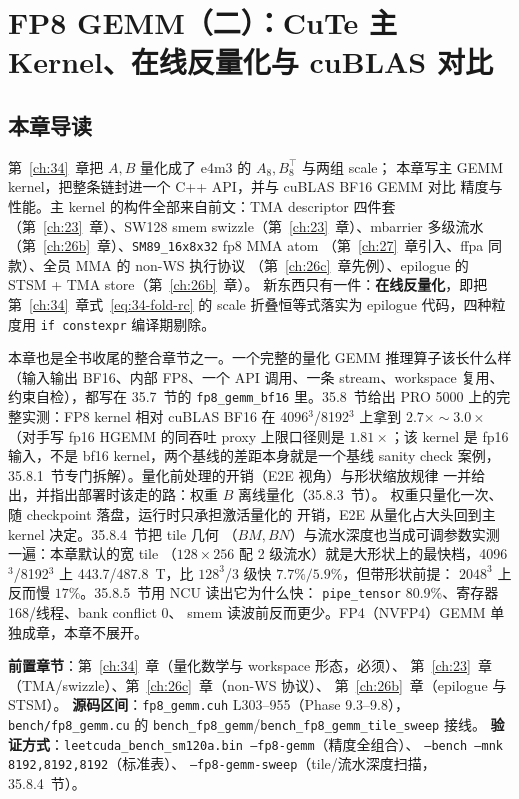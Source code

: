 \chapter{FP8 GEMM（二）：CuTe 主 Kernel、在线反量化与 cuBLAS 对比}\label{ch:35}

\section{本章导读}

第~\ref{ch:34}~章把 $A,B$ 量化成了 e4m3 的 $A_8,B_8^{\top}$ 与两组 scale；
本章写主 GEMM kernel，把整条链封进一个 C++ API，并与 cuBLAS BF16 GEMM 对比
精度与性能。主 kernel 的构件全部来自前文：TMA descriptor 四件套
（第~\ref{ch:23}~章）、SW128 smem swizzle（第~\ref{ch:23}~章）、mbarrier
多级流水（第~\ref{ch:26b}~章）、\texttt{SM89\_16x8x32} fp8 MMA atom
（第~\ref{ch:27}~章引入、ffpa 同款）、全员 MMA 的 non-WS 执行协议
（第~\ref{ch:26c}~章先例）、epilogue 的 STSM + TMA store（第~\ref{ch:26b}~章）。
新东西只有一件：\textbf{在线反量化}，即把第~\ref{ch:34}~章式~\ref{eq:34-fold-rc}
的 scale 折叠恒等式落实为 epilogue 代码，四种粒度用 \texttt{if constexpr}
编译期剔除。

本章也是全书收尾的整合章节之一。一个完整的量化 GEMM 推理算子该长什么样
（输入输出 BF16、内部 FP8、一个 API 调用、一条 stream、workspace 复用、
约束自检），都写在 35.7~节的 \texttt{fp8\_gemm\_bf16} 里。35.8~节给出 PRO 5000
上的完整实测：FP8 kernel 相对 cuBLAS BF16 在 4096$^3$/8192$^3$ 上拿到
$2.7\times\sim3.0\times$（对手写 fp16 HGEMM 的同吞吐 proxy 上限口径则是
$1.81\times$；该 kernel 是 fp16 输入，不是 bf16 kernel，两个基线的差距本身就是一个基线 sanity check 案例，
35.8.1~节专门拆解）。量化前处理的开销（E2E 视角）与形状缩放规律
一并给出，并指出部署时该走的路：权重 $B$ 离线量化（35.8.3~节）。
权重只量化一次、随 checkpoint 落盘，运行时只承担激活量化的
开销，E2E 从量化占大头回到主 kernel 决定。35.8.4~节把 tile 几何
（$BM,BN$）与流水深度也当成可调参数实测一遍：本章默认的宽 tile
（$128\times256$ 配 2 级流水）就是大形状上的最快档，4096$^3$/8192$^3$ 上
443.7/487.8~T，比 $128^3$/3 级快 $7.7\%/5.9\%$，但带形状前提：
$2048^3$ 上反而慢 $17\%$。35.8.5~节用 NCU 读出它为什么快：
\texttt{pipe\_tensor} 80.9\%、寄存器 168/线程、bank conflict 0、
smem 读波前反而更少。FP4（NVFP4）GEMM 单独成章，本章不展开。

\textbf{前置章节}：第~\ref{ch:34}~章（量化数学与 workspace 形态，必须）、
第~\ref{ch:23}~章（TMA/swizzle）、第~\ref{ch:26c}~章（non-WS 协议）、
第~\ref{ch:26b}~章（epilogue 与 STSM）。
\textbf{源码区间}：\texttt{fp8\_gemm.cuh} L303--955（Phase 9.3--9.8），
\texttt{bench/fp8\_gemm.cu} 的 \texttt{bench\_fp8\_gemm}/\texttt{bench\_fp8\_gemm\_tile\_sweep}
接线。
\textbf{验证方式}：\texttt{leetcuda\_bench\_sm120a.bin --fp8-gemm}（精度全组合）、
\texttt{--bench --mnk 8192,8192,8192}（标准表）、
\texttt{--fp8-gemm-sweep}（tile/流水深度扫描，35.8.4~节）。

